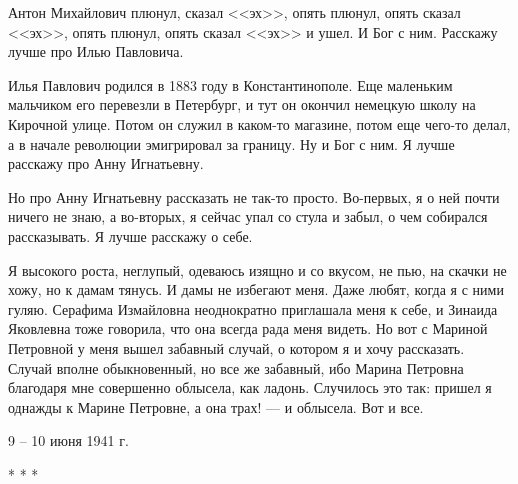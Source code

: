 
Антон Михайлович плюнул, сказал <<эх>>, опять плюнул, опять сказал <<эх>>, опять плюнул, опять сказал <<эх>> и ушел. И Бог с ним. Расскажу лучше про Илью Павловича.

Илья Павлович родился в 1883 году в Константинополе. Еще маленьким мальчиком его перевезли в Петербург, и тут он окончил немецкую школу на Кирочной улице. Потом он служил в каком-то магазине, потом еще чего-то делал, а в начале революции эмигрировал за границу. Ну и Бог с ним. Я лучше расскажу про Анну Игнатьевну.

Но про Анну Игнатьевну рассказать не так-то просто. Во-первых, я о ней почти ничего не знаю, а во-вторых, я сейчас упал со стула и забыл, о чем собирался рассказывать. Я лучше расскажу о себе.

Я высокого роста, неглупый, одеваюсь изящно и со вкусом, не пью, на скачки не хожу, но к дамам тянусь. И дамы не избегают меня. Даже любят, когда я с ними гуляю. Серафима Измайловна неоднократно приглашала меня к себе, и Зинаида Яковлевна тоже говорила, что она всегда рада меня видеть. Но вот с Мариной Петровной у меня вышел забавный случай, о котором я и хочу рассказать. Случай вполне обыкновенный, но все же забавный, ибо Марина Петровна благодаря мне совершенно облысела, как ладонь. Случилось это так: пришел я однажды к Марине Петровне, а она трах! --- и облысела. Вот и все. 

\begin{flushright} 9 -- 10 июня 1941 г. \end{flushright} 
\begin{center} * * * \end{center} 